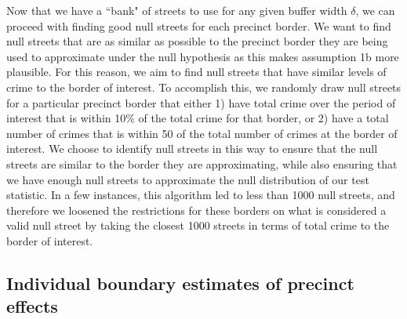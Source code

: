 \documentclass[a4paper,11pt]{article}
\begin{document}
Now that we have a ``bank" of streets to use for any given buffer width $\delta$, we can proceed with finding good null streets for each precinct border. We want to find null streets that are as similar as possible to the precinct border they are being used to approximate under the null hypothesis as this makes assumption 1b more plausible. For this reason, we aim to find null streets that have similar levels of crime to the border of interest. To accomplish this, we randomly draw null streets for a particular precinct border that either 1) have total crime over the period of interest that is within 10\% of the total crime for that border, or 2) have a total number of crimes that is within 50 of the total number of crimes at the border of interest. We choose to identify null streets in this way to ensure that the null streets are similar to the border they are approximating, while also ensuring that we have enough null streets to approximate the null distribution of our test statistic. In a few instances, this algorithm led to less than 1000 null streets, and therefore we loosened the restrictions for these borders on what is considered a valid null street by taking the closest 1000 streets in terms of total crime to the border of interest. 

\subsection{Individual boundary estimates of precinct effects}
\end{document}
